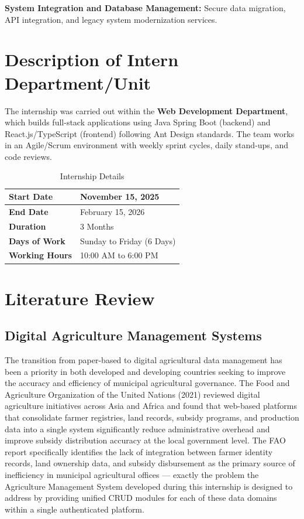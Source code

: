 \documentclass[12pt,a4paper]{report}
\begin{document}
\textbf{System Integration and Database Management:} Secure data migration, API
integration, and legacy system modernization services.

\section{Description of Intern Department/Unit}

The internship was carried out within the \textbf{Web Development Department}, which
builds full-stack applications using Java Spring Boot (backend) and React.js/TypeScript
(frontend) following Ant Design standards. The team works in an Agile/Scrum environment
with weekly sprint cycles, daily stand-ups, and code reviews.

\begin{table}[H]
\centering
\caption{Internship Details}
\renewcommand{\arraystretch}{1.4}
\begin{tabular}{|p{5.5cm}|p{7.5cm}|}
\hline
\textbf{Start Date} & November 15, 2025 \\
\hline
\textbf{End Date} & February 15, 2026 \\
\hline
\textbf{Duration} & 3 Months \\
\hline
\textbf{Days of Work} & Sunday to Friday (6 Days) \\
\hline
\textbf{Working Hours} & 10:00 AM to 6:00 PM \\
\hline
\end{tabular}
\end{table}

\section{Literature Review}

\subsection{Digital Agriculture Management Systems}

The transition from paper-based to digital agricultural data management has been a
priority in both developed and developing countries seeking to improve the accuracy and
efficiency of municipal agricultural governance. The Food and Agriculture Organization
of the United Nations (2021) reviewed digital agriculture initiatives across Asia and
Africa and found that web-based platforms that consolidate farmer registries, land
records, subsidy programs, and production data into a single system significantly reduce
administrative overhead and improve subsidy distribution accuracy at the local government
level. The FAO report specifically identifies the lack of integration between farmer
identity records, land ownership data, and subsidy disbursement as the primary source
of inefficiency in municipal agricultural offices — exactly the problem the Agriculture
Management System developed during this internship is designed to address by providing
unified CRUD modules for each of these data domains within a single authenticated
platform.
\end{document}
